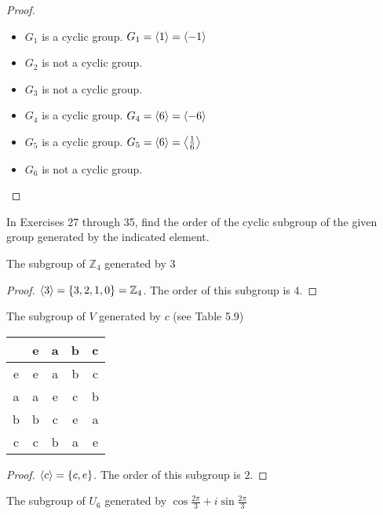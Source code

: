 \begin{proof}
    \begin{itemize}
        \item $G_{1}$ is a cyclic group. $G_{1} = \left\langle{1}\right\rangle = \left\langle{-1}\right\rangle$
        \item $G_{2}$ is not a cyclic group.
        \item $G_{3}$ is not a cyclic group.
        \item $G_{4}$ is a cyclic group. $G_{4} = \left\langle{6}\right\rangle = \left\langle{-6}\right\rangle$
        \item $G_{5}$ is a cyclic group. $G_{5} = \left\langle{6}\right\rangle = \left\langle{\frac{1}{6}}\right\rangle$
        \item $G_{6}$ is not a cyclic group.
    \end{itemize}
\end{proof}

In Exercises 27 through 35, find the order of the cyclic subgroup of the given group generated by the indicated element.

\newpage
\begin{exercise}
    The subgroup of $\mathbb{Z}_{4}$ generated by $3$
\end{exercise}

\begin{proof}
    $\left\langle{3}\right\rangle = \{ 3, 2, 1, 0 \} = \mathbb{Z}_{4}$. The order of this subgroup is $4$.
\end{proof}

\newpage
\begin{exercise}
    The subgroup of $V$ generated by $c$ (see Table 5.9)
    \begin{tabular}{c|cccc}
          & e & a & b & c \\
        \hline
        e & e & a & b & c \\
        a & a & e & c & b \\
        b & b & c & e & a \\
        c & c & b & a & e
    \end{tabular}
\end{exercise}

\begin{proof}
    $\left\langle{c}\right\rangle = \{ c, e \}$. The order of this subgroup is $2$.
\end{proof}

\newpage
\begin{exercise}
    The subgroup of $U_{6}$ generated by $\cos\frac{2\pi}{3} + i\sin\frac{2\pi}{3}$
\end{exercise}

